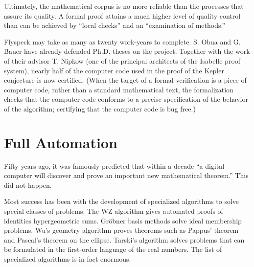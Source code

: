 \documentclass{llncs}
\begin{document}
Ultimately, the mathematical corpus is no more reliable than the processes
that assure its quality.  A formal proof attains a much
higher level of quality control than can be achieved by ``local checks''
and an ``examination of methods.''


Flyspeck may take as many as twenty work-years to complete. S. Obua and G. Bauer have already defended Ph.D. theses 
on the  project.  
Together with the work of
their advisor T. Nipkow (one of the principal architects of the Isabelle proof system), nearly half of the computer code
used in the proof of the Kepler conjecture is now 
certified.
(When
the target of a formal verification is a piece of computer code, rather
than a standard mathematical text, the formalization checks that the
computer code conforms to a precise specification of the behavior
of the algorithm; certifying that the computer code is bug free.)




\section{Full Automation}

Fifty years ago, it was famously predicted that
within a decade ``a digital computer will discover and prove
an important new mathematical theorem.''
This did not happen.


Most success has been with
the development of specialized algorithms to solve special classes
of problems.  The WZ algorithm  gives  automated proofs of identities
hypergeometric sums.   Gr\"obner basis
methods solve ideal membership problems.
Wu's geometry algorithm proves theorems such as
Pappus' theorem
and Pascal's theorem on the ellipse.
Tarski's algorithm  solves
problems that can be formulated in the first-order language of the real numbers.
The list of specialized algorithms is in fact enormous.
\end{document}
